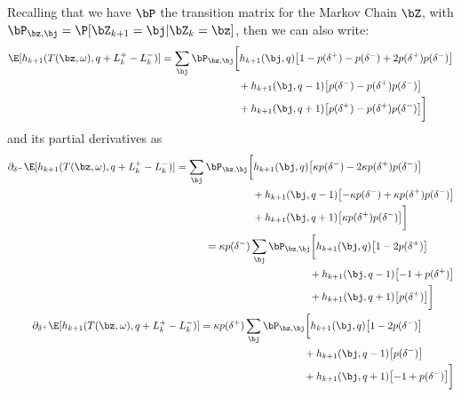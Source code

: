 \documentclass[12pt]{article}
\begin{document}
Recalling that we have  $\bP$ the transition matrix for the Markov Chain $\bZ$, with $\bP_{\bz, \bj} = \P[\bZ_{k+1} = \bj | \bZ_k = \bz]$, then we can also write:
\begin{equation}
\begin{split}
\E[h_{k+1}(T(\bz,\omega), q + L_k^+ - L_k^- )] & = \sum_\bj \bP_{\bz,\bj} \biggl[ h_{k+1}(\bj, q) \bigl[ 1 - p(\delta^+) - p(\delta^-) + 2 p(\delta^+) p(\delta^-) \bigr]  \\
& \hphantom{\sum_\bj \bP_{\bz,\bj} \biggl[ {}+{}} + h_{k+1}(\bj, q-1) \bigl[ p(\delta^-)  - p(\delta^+) p(\delta^-) \bigr]   \\
& \hphantom{\sum_\bj \bP_{\bz,\bj} \biggl[ {}+{}} + h_{k+1}(\bj, q+1) \bigl[ p(\delta^+)  - p(\delta^+) p(\delta^-) \bigr] \biggr]  \\
\end{split}
\end{equation}
and its partial derivatives as
\begin{align}
\begin{split}
\partial_{\delta^-} \E[h_{k+1}(T(\bz,\omega), q + L_k^+ - L_k^- )] & = 
\sum_\bj \bP_{\bz,\bj} \biggl[ h_{k+1}(\bj, q) \bigl[ \kappa p(\delta^-) - 2 \kappa p(\delta^+) p(\delta^-) \bigr]  \\
& \hphantom{\sum_\bj \bP_{\bz,\bj} \biggl[ {}+{}} + h_{k+1}(\bj, q-1) \bigl[ -\kappa p(\delta^-) + \kappa p(\delta^+) p(\delta^-) \bigr]   \\
& \hphantom{\sum_\bj \bP_{\bz,\bj} \biggl[ {}+{}} + h_{k+1}(\bj, q+1) \bigl[ \kappa p(\delta^+) p(\delta^-) \bigr] \biggr]
\end{split} \\
\begin{split}
& = \kappa p(\delta^-) \sum_\bj \bP_{\bz,\bj} \biggl[ h_{k+1}(\bj, q) \bigl[ 1 - 2 p(\delta^+) \bigr]  \\
& \hphantom{d(\delta^-) \sum_\bj \bP_{\bz,\bj} \biggl[ {}+{}} + h_{k+1}(\bj, q-1) \bigl[-1 + p(\delta^+) \bigr]   \\
& \hphantom{d(\delta^-) \sum_\bj \bP_{\bz,\bj} \biggl[ {}+{}} + h_{k+1}(\bj, q+1) \bigl[ p(\delta^+) \bigr] \biggr]
\end{split} \\
\begin{split}
\partial_{\delta^+} \E[h_{k+1}(T(\bz,\omega), q + L_k^+ - L_k^- )] & = 
\kappa p(\delta^+) \sum_\bj \bP_{\bz,\bj} \biggl[ h_{k+1}(\bj, q) \bigl[ 1 - 2 p(\delta^-) \bigr]  \\
& \hphantom{d(\delta^-) \sum_\bj \bP_{\bz,\bj} \biggl[ {}+{}} + h_{k+1}(\bj, q-1) \bigl[ p(\delta^-) \bigr]   \\
& \hphantom{d(\delta^-) \sum_\bj \bP_{\bz,\bj} \biggl[ {}+{}} + h_{k+1}(\bj, q+1) \bigl[ -1 + p(\delta^-) \bigr] \biggr]
\end{split}
\end{align}
\end{document}
